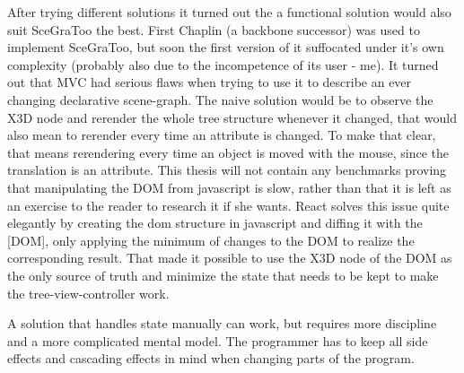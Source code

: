 After trying different solutions it turned out the a functional solution
would also suit SceGraToo the best. First Chaplin (a backbone successor)
was used to implement SceGraToo, but soon the first version of it
suffocated under it's own complexity (probably also due to the
incompetence of its user - me). It turned out that MVC had serious flaws
when trying to use it to describe an ever changing declarative
scene-graph. The naive solution would be to observe the X3D node and
rerender the whole tree structure whenever it changed, that would also
mean to rerender every time an attribute is changed. To make that clear,
that means rerendering every time an object is moved with the mouse,
since the translation is an attribute. This thesis will not contain any
benchmarks proving that manipulating the DOM from javascript is slow,
rather than that it is left as an exercise to the reader to research it
if she wants. React solves this issue quite elegantly by creating the
dom structure in javascript and diffing it with the {[}DOM{]}, only
applying the minimum of changes to the DOM to realize the corresponding
result. That made it possible to use the X3D node of the DOM as the only
source of truth and minimize the state that needs to be kept to make the
tree-view-controller work.

A solution that handles state manually can work, but requires more
discipline and a more complicated mental model. The programmer has to
keep all side effects and cascading effects in mind when changing parts
of the program.
